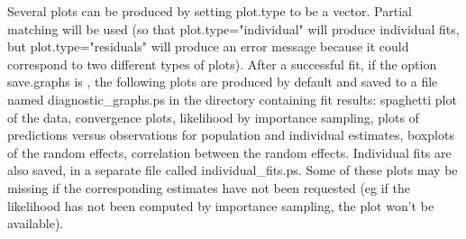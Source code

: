 Several plots can be produced by setting {\sf plot.type} to be a vector. Partial matching will be used (so that {\sf plot.type="individual"} will produce individual fits, but {\sf plot.type="residuals"} will produce an error message because it could correspond to two different types of plots). After a successful fit, if the option {\sf save.graphs} is \true, the following plots are produced by default and saved to a file named {\sf diagnostic\_graphs.ps} in the directory containing fit results: spaghetti plot of the data, convergence plots, likelihood by importance sampling, plots of predictions versus observations for population and individual estimates, boxplots of the random effects, correlation between the random effects. Individual fits are also saved, in a separate file called {\sf individual\_fits.ps}. Some of these plots may be missing if the corresponding estimates have not been requested (eg if the likelihood has not been computed by importance sampling, the plot won't be available).


